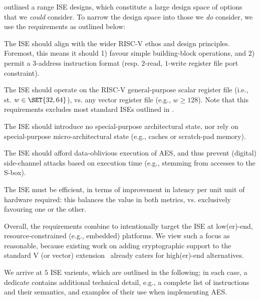 
outlined a range ISE designs, which constitute a large design space of
options that we {\em could} consider.  To narrow the design space into
those we {\em do} consider, we use the requirements as outlined below:

\begin{requirement}
The ISE should align with the wider RISC-V ethos and design principles.
Foremost, this means it should 
1) favour simple building-block operations,
   and
2) permit a $3$-address instruction format
   (resp. $2$-read, $1$-write register file port constraint).
\end{requirement}

\begin{requirement}
The ISE should operate on 
the RISC-V general-purpose scalar register file 
(i.e., st. $w \in \SET{32,64}$),
vs. 
any                        vector register file
(e.g., $w \ge 128$).
Note that this requirements excludes most standard ISEs outlined in 
.
\end{requirement}

\begin{requirement}
The ISE should introduce no
special-purpose       architectural state, 
nor rely on
special-purpose micro-architectural state
(e.g., caches or scratch-pad memory).
\end{requirement}

\begin{requirement}
The ISE should afford data-oblivious execution of AES, and thus prevent 
(digital) side-channel attacks based on execution time 
(e.g., stemming from accesses to the S-box).
\end{requirement}


\begin{requirement}
The ISE must be efficient, in terms of improvement in latency per unit
unit of hardware required: this balances the value in both metrics, vs.
exclusively favouring one or the other.
\end{requirement}

\noindent
Overall, the requirements combine to intentionally target the ISE at 
 low(er)-end,
resource-constrained (e.g., embedded) platforms.  
We view such a focus as reasonable, because existing work on adding
cryptographic support to the
standard V 
(or vector) 
extension~\cite[Section 21]{RV:ISA:I:19}
already caters for
high(er)-end
alternatives.

We arrive at $5$ ISE varients, which are outlined in the following;
in each case, a dedicate \APPX contains additional technical detail, e.g.,
a complete list of instructions and their semantics, and examples of their
use when implementing AES.

